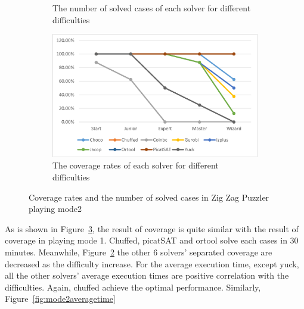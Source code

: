 \begin{figure}[htbp]
\begin{subfigure}[b]{0.48\textwidth}
    \caption{The number of solved cases of each solver for different difficulties}
    \label{fig:mode2eva3}
    \end{subfigure}
    \begin{subfigure}[b]{0.48\textwidth}
    \includegraphics[width=\textwidth]{figs/mode2seperatedcoverage.png}
    \caption{The coverage rates of each solver for different difficulties}
    \label{fig:mode2eva4}
    \end{subfigure}
    \caption{Coverage rates and the number of solved cases in Zig Zag Puzzler playing mode2}
    \label{fig:comparisonmode2}
\end{figure}
As is shown in Figure~\ref{fig:comparisonmode2}, the result of coverage is quite similar with the result of coverage in playing mode 1. Chuffed, picatSAT and ortool solve each cases in 30 minutes. Meanwhile, Figure~\ref{fig:mode2eva4} the other 6 solvers' separated coverage are decreased as the difficulty increase.
For the average execution time, except yuck, all the other solvers' average execution times are positive correlation with the difficulties. Again, chuffed achieve the optimal performance. 
Similarly, Figure~\ref{fig:mode2averagetime} 
